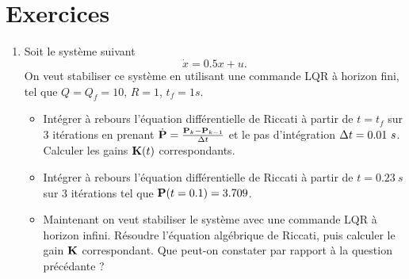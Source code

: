 \section{Exercices}
\begin{enumerate}
	\item Soit le système suivant 
	\begin{equation}
		\dot{x} = 0.5x + u .
	\end{equation}
	On veut stabiliser ce système en utilisant une commande LQR à horizon fini, tel que $Q=Q_f=10$, $R=1$, $t_f = 1s$.
	\begin{itemize}
		\item Intégrer à rebours l'équation différentielle de Riccati à partir de $t=t_f$ sur 3 itérations en prenant $\boldmath{\dot{\mathbf{P}}}=\frac{\mathbf{P}_{k}-\mathbf{P}_{k-1}}{\Delta t}$ et le pas d'intégration $\Delta t = 0.01~s$. Calculer les gains $\mathbf{K}(t)$ correspondants.
		\item Intégrer à rebours l'équation différentielle de Riccati à partir de $t=0.23~s$ sur 3 itérations tel que $\mathbf{P}(t=0.1)=3.709$. 
		\item Maintenant on veut stabiliser le système avec une commande LQR à horizon infini. Résoudre l'équation algébrique de Riccati, puis calculer le gain $\mathbf{K}$ correspondant. Que peut-on constater par rapport à la question précédante ?
	\end{itemize}
	

\end{enumerate}
